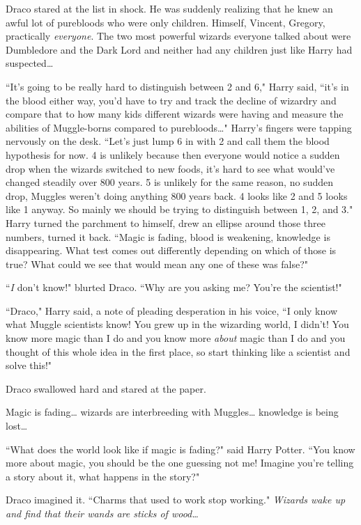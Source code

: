 Draco stared at the list in shock. He was suddenly realizing that he knew an awful lot of purebloods who were only children. Himself, Vincent, Gregory, practically \emph{everyone}. The two most powerful wizards everyone talked about were Dumbledore and the Dark Lord and neither had any children just like Harry had suspected{\ldots}

``It's going to be really hard to distinguish between 2 and 6," Harry said, ``it's in the blood either way, you'd have to try and track the decline of wizardry and compare that to how many kids different wizards were having and measure the abilities of Muggle-borns compared to purebloods{\ldots}" Harry's fingers were tapping nervously on the desk. ``Let's just lump 6 in with 2 and call them the blood hypothesis for now. 4 is unlikely because then everyone would notice a sudden drop when the wizards switched to new foods, it's hard to see what would've changed steadily over 800 years. 5 is unlikely for the same reason, no sudden drop, Muggles weren't doing anything 800 years back. 4 looks like 2 and 5 looks like 1 anyway. So mainly we should be trying to distinguish between 1, 2, and 3." Harry turned the parchment to himself, drew an ellipse around those three numbers, turned it back. ``Magic is fading, blood is weakening, knowledge is disappearing. What test comes out differently depending on which of those is true? What could we see that would mean any one of these was false?"

``\emph{I} don't know!" blurted Draco. ``Why are you asking me? You're the scientist!"

``Draco," Harry said, a note of pleading desperation in his voice, ``I only know what Muggle scientists know! You grew up in the wizarding world, I didn't! You know more magic than I do and you know more \emph{about} magic than I do and you thought of this whole idea in the first place, so start thinking like a scientist and solve this!"

Draco swallowed hard and stared at the paper.

Magic is fading{\ldots} wizards are interbreeding with Muggles{\ldots} knowledge is being lost{\ldots}

``What does the world look like if magic is fading?" said Harry Potter. ``You know more about magic, you should be the one guessing not me! Imagine you're telling a story about it, what happens in the story?"

Draco imagined it. ``Charms that used to work stop working." \emph{Wizards wake up and find that their wands are sticks of wood{\ldots}}

